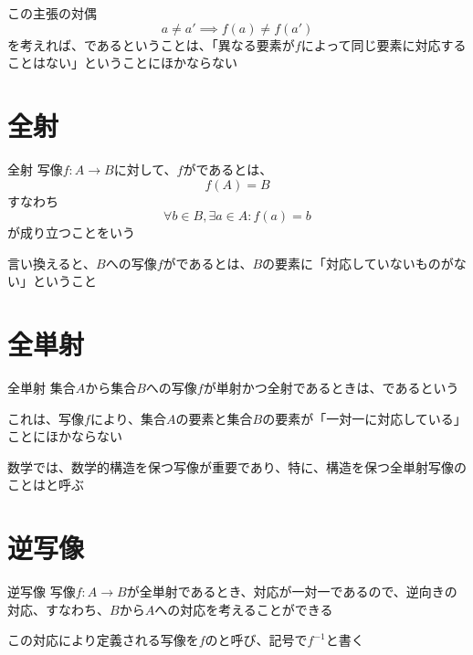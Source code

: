 \documentclass[b5paper,12pt,notitlepage]{jsreport}
\begin{document}
この主張の対偶
\begin{equation*}
  a \ne a' \implies f(a) \ne f(a')
\end{equation*}
を考えれば、であるということは、「異なる要素が$f$によって同じ要素に対応することはない」ということにほかならない

\sectionline
\section{全射}

\begin{definition}{全射}
  写像$f\colon A \to B$に対して、$f$がであるとは、
  \begin{equation*}
    f(A) = B
  \end{equation*}
  すなわち
  \begin{equation*}
    \forall b \in B, \exists a \in A\colon f(a) = b
  \end{equation*}
  が成り立つことをいう
\end{definition}

言い換えると、$B$への写像$f$がであるとは、$B$の要素に「対応していないものがない」ということ

\sectionline
\section{全単射}

\begin{definition}{全単射}
  集合$A$から集合$B$への写像$f$が単射かつ全射であるときは、であるという
\end{definition}

これは、写像$f$により、集合$A$の要素と集合$B$の要素が「一対一に対応している」ことにほかならない

\sectionline

数学では、数学的構造を保つ写像が重要であり、特に、構造を保つ全単射写像のことはと呼ぶ

\sectionline
\section{逆写像}

\begin{definition}{逆写像}
  写像$f\colon A \to B$が全単射であるとき、対応が一対一であるので、逆向きの対応、すなわち、$B$から$A$への対応を考えることができる

  この対応により定義される写像を$f$のと呼び、記号で$f^{-1}$と書く
\end{definition}
\end{document}
